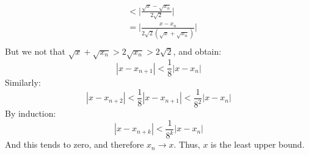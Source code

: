 \documentclass[crop=false,class=book,oneside]{standalone}
\begin{document}
\begin{lexample}
\begin{align}
                    &<\Big|\frac{\sqrt{x}-\sqrt{x_{n}}}{2\sqrt{2}}
                        \Big|\\
                    &=\Big|\frac{x-x_{n}}
                        {2\sqrt{2}(\sqrt{x}+\sqrt{x_{n}})}\Big|\\
                \end{align}
                But we not that
                $\sqrt{x}+\sqrt{x_{n}}>2\sqrt{x_{n}}>2\sqrt{2}$,
                and obtain:
                \begin{equation}
                    |x-x_{n+1}|<\frac{1}{8}|x-x_{n}|
                \end{equation}
                Similarly:
                \begin{equation}
                    |x-x_{n+2}|<\frac{1}{8}|x-x_{n+1}|<
                    \frac{1}{8^{2}}|x-x_{n}|
                \end{equation}
                By induction:
                \begin{equation}
                    |x-x_{n+k}|<\frac{1}{8^{k}}|x-x_{n}|
                \end{equation}
                And this tends to zero, and therefore
                $x_{n}\rightarrow{x}$. Thus, $x$ is the least
                upper bound.
            \end{lexample}
\end{document}
